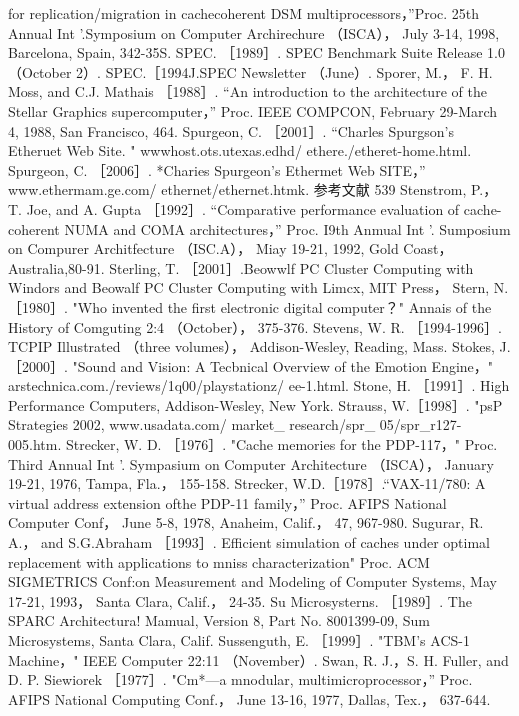 for replication/migration in cachecoherent DSM multiprocessors，”Proc. 25th Annual Int '.Symposium on Computer
Archirechure （ISCA）， July 3-14, 1998, Barcelona, Spain, 342-35S.
SPEC. ［1989］. SPEC Benchmark Suite Release 1.0 （October 2）.
SPEC.［1994J.SPEC Newsletter （June）.
Sporer, M.， F. H. Moss, and C.J. Mathais ［1988］. “An introduction to the architecture of the Stellar Graphics supercomputer，”
Proc. IEEE COMPCON, February 29-March 4, 1988, San Francisco, 464.
Spurgeon, C. ［2001］. “Charles Spurgson's Etheruet Web Site. " wwwhost.ots.utexas.edhd/ ethere./etheret-home.html.
Spurgeon, C. ［2006］. *Charies Spurgeon's Ethermet Web SITE，” www.ethermam.ge.com/ ethernet/ethernet.htmk.
参考文献
539
Stenstrom, P.， T. Joe, and A. Gupta ［1992］. “Comparative performance evaluation of cache-coherent NUMA and COMA
architectures，” Proc. I9th Anmual Int '. Sumposium on Compurer Architfecture （ISC.A）， Miay 19-21, 1992, Gold Coast，
Australia,80-91.
Sterling, T. ［2001］.Beowwlf PC Cluster Computing with Windors and Beowalf PC Cluster Computing with Limcx, MIT Press，
Stern, N. ［1980］. "Who invented the first electronic digital computer？" Annais of the History of Comguting 2:4 （October），
375-376.
Stevens, W. R. ［1994-1996］. TCPIP Illustrated （three volumes）， Addison-Wesley, Reading, Mass.
Stokes, J. ［2000］. "Sound and Vision: A Tecbnical Overview of the Emotion Engine，" arstechnica.com./reviews/1q00/playstationz/
ee-1.html.
Stone, H. ［1991］. High Performance Computers, Addison-Wesley, New York.
Strauss, W.［1998］. "psP Strategies 2002, www.usadata.com/ market_ research/spr_ 05/spr_r127-005.htm.
Strecker, W. D. ［1976］. "Cache memories for the PDP-117，" Proc. Third Annual Int '. Sympasium on Computer Architecture
（ISCA）， January 19-21, 1976, Tampa, Fla.， 155-158.
Strecker, W.D.［1978］.“VAX-11/780: A virtual address extension ofthe PDP-11 family，” Proc. AFIPS National Computer Conf，
June 5-8, 1978, Anaheim, Calif.， 47, 967-980.
Sugurar, R. A.， and S.G.Abraham ［1993］. Efficient simulation of caches under optimal replacement with applications to mniss
characterization" Proc. ACM SIGMETRICS Conf:on Measurement and Modeling of Computer Systems, May 17-21, 1993，
Santa Clara, Calif.， 24-35.
Su Microsysterns. ［1989］. The SPARC Architectura! Mamual, Version 8, Part No. 8001399-09, Sum Microsystems, Santa Clara, Calif.
Sussenguth, E. ［1999］. "TBM's ACS-1 Machine，" IEEE Computer 22:11 （November）.
Swan, R. J.，S. H. Fuller, and D. P. Siewiorek ［1977］. "Cm*—a mnodular, multimicroprocessor，” Proc. AFIPS National
Computing Conf.， June 13-16, 1977, Dallas, Tex.， 637-644.
